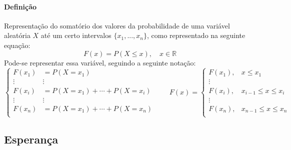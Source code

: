 \documentclass{article}
\begin{document}
            \paragraph{Definição}Representação do somatório dos valores da probabilidade de uma variável aleatória $X$ até um certo intervalos $\{x_{1}, ..., x_{n}\}$, como representado na seguinte equação:
                \begin{equation}
                    \boxed{
                        F(x) = P(X \le x), \quad x\in\mathbb{R}
                    }
                \end{equation}
            Pode-se representar essa variável, seguindo a seguinte notação:
                \begin{equation}
                    \begin{cases}
                        F(x_{1}) &= P(X = x_{1})\\
                        \vdots   & \vdots\\
                        F(x_{i}) &= P(X = x_{1}) + \cdots + P(X = x_{i})\\
                        \vdots   & \vdots\\
                        F(x_{n}) &= P(X = x_{1}) + \cdots + P(X = x_{n})\\
                    \end{cases}
                    \qquad
                    \boxed{
                        F(x) =
                        \begin{cases}
                            F(x_{1}), & x \le x_{1} \\
                            \vdots    & \\
                            F(x_{i}), & x_{i-1} \le x \le x_{i}\\
                            \vdots    & \\
                            F(x_{n}), & x_{n-1} \le x \le x_{n}\\
                        \end{cases}
                    }
                \end{equation}

        \subsection{Esperança}
\end{document}

